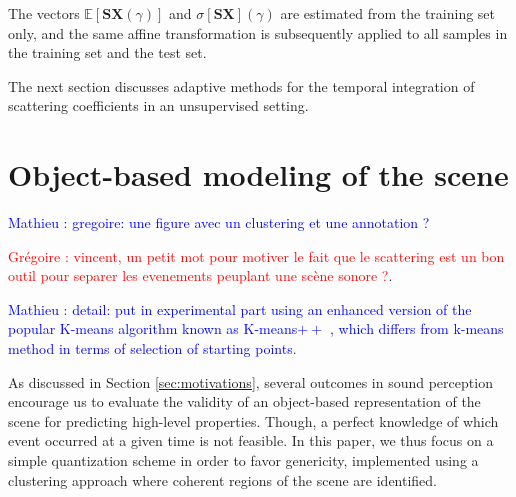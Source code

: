 \documentclass[journal]{IEEEtran}
\newcommand{\gl}[1]{\textcolor{red}{Gr\'egoire : #1}}
\newcommand{\ml}[1]{\textcolor{blue}{ Mathieu : #1}}
\begin{document}
 The vectors $\mathbb{E}[\mathbf{S}\boldsymbol{X}(\gamma)]$ and $\sigma[\mathbf{S}\boldsymbol{X}](\gamma)$ are estimated from the training set only, and the same affine transformation is subsequently applied to all samples in the training set and the test set.
 
The next section discusses adaptive methods for the temporal integration of scattering coefficients in an unsupervised setting.

\section{Object-based modeling of the scene}
\label{sec:object}



\ml{gregoire: une figure avec un clustering et une annotation ?}

\gl{vincent, un petit mot pour motiver le fait que le scattering est un bon outil pour separer les evenements peuplant une scène sonore ?}. 

\ml{detail: put in experimental part using an enhanced version of the popular K-means algorithm known as K-means$++$ \cite{arthur2007k}, which differs from k-means method in terms of selection of starting points. }

As discussed in Section \ref{sec:motivations}, several outcomes in sound perception encourage us to evaluate the validity of an object-based representation of the scene for predicting high-level properties. Though, a perfect knowledge of which event occurred at a given time is not feasible. In this paper, we thus focus on a simple quantization scheme in order to favor genericity, implemented using a clustering approach where coherent regions of the scene are identified.
\end{document}
